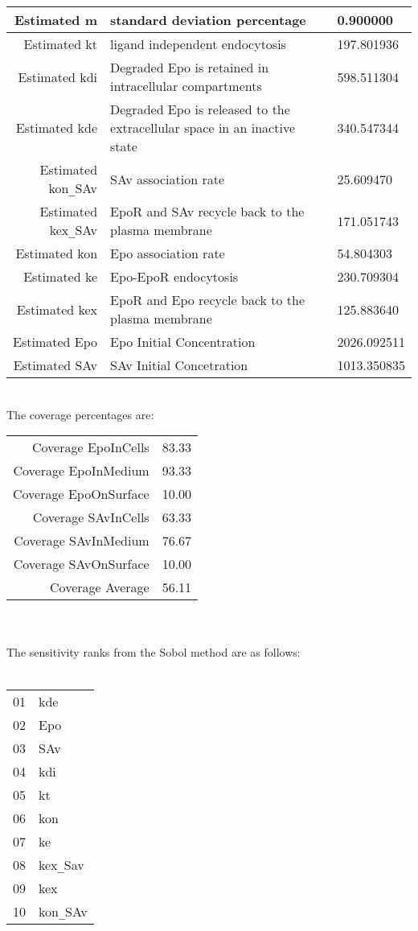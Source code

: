 \documentclass[12pt]{article}
\begin{document}
\begin{tabular}{r|p{8cm}|l }
\hline
Estimated m& standard deviation percentage& 0.900000\\
\hline
Estimated kt&ligand independent endocytosis& 197.801936\\
\hline
Estimated kdi&Degraded Epo is retained in intracellular
compartments& 598.511304\\
\hline
Estimated kde&Degraded Epo is released to the extracellular
space in an inactive state & 340.547344\\
\hline
Estimated kon\verb|_|SAv&SAv association rate& 25.609470\\
\hline
Estimated kex\verb|_|SAv&EpoR and SAv recycle back to the plasma membrane& 171.051743\\
\hline
Estimated kon&Epo association rate& 54.804303\\
\hline
Estimated ke&Epo-EpoR endocytosis& 230.709304\\
\hline
Estimated kex&EpoR and Epo recycle back to the plasma membrane& 125.883640\\
\hline
Estimated Epo&Epo Initial Concentration& 2026.092511\\
\hline
Estimated SAv&SAv Initial Concetration& 1013.350835\\
\hline
\end{tabular}
\\

The coverage percentages are:\\


\begin{tabular}{r|l}
Coverage EpoInCells & 83.33\\
Coverage EpoInMedium & 93.33\\
Coverage EpoOnSurface & 10.00\\
Coverage SAvInCells & 63.33\\
Coverage SAvInMedium & 76.67\\
Coverage SAvOnSurface & 10.00\\
Coverage Average & 56.11 \\
\end{tabular} \\ \\

The sensitivity ranks from the Sobol method are as follows: \\
\\
\begin{center}
\begin{tabular}{r|l}
01& kde\\
02& Epo\\
03& SAv\\
04& kdi\\
05& kt\\
06& kon\\
07& ke\\
08& kex\verb|_|Sav\\
09& kex\\
10& kon\verb|_|SAv\\

\end{tabular}
\end{center}
\end{document}
